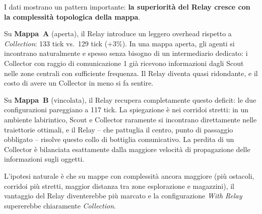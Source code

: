 I dati mostrano un pattern importante: \textbf{la superiorità del Relay cresce con la complessità topologica della mappa}.

Su \textbf{Mappa~A} (aperta), il Relay introduce un leggero overhead rispetto a \emph{Collection}: 133 tick vs.\ 129 tick (+3\%). In una mappa aperta, gli agenti si incontrano naturalmente e spesso senza bisogno di un intermediario dedicato: i Collector con raggio di comunicazione 1 già ricevono informazioni dagli Scout nelle zone centrali con sufficiente frequenza. Il Relay diventa quasi ridondante, e il costo di avere un Collector in meno si fa sentire.

Su \textbf{Mappa~B} (vincolata), il Relay recupera completamente questo deficit: le due configurazioni pareggiano a 117 tick. La spiegazione è nei corridoi stretti: in un ambiente labirintico, Scout e Collector raramente si incontrano direttamente nelle traiettorie ottimali, e il Relay -- che pattuglia il centro, punto di passaggio obbligato -- risolve questo collo di bottiglia comunicativo. La perdita di un Collector è bilanciata esattamente dalla maggiore velocità di propagazione delle informazioni sugli oggetti.

L'ipotesi naturale è che su mappe con complessità ancora maggiore (più ostacoli, corridoi più stretti, maggior distanza tra zone esplorazione e magazzini), il vantaggio del Relay diventerebbe più marcato e la configurazione \emph{With Relay} supererebbe chiaramente \emph{Collection}.
